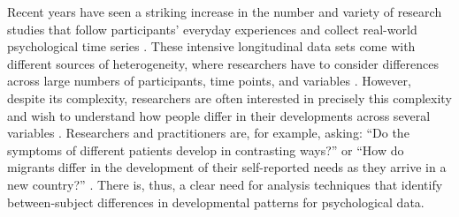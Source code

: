\documentclass[man, 12pt, a4paper, floatsintext]{apa7}
\theoremstyle{break}
\theoremstyle{plain}
\begin{document}

Recent years have seen a striking increase in the number and variety of research studies that follow participants' everyday experiences and collect real-world psychological time series \citep[e.g.,][]{hamaker2017}. These intensive longitudinal data sets come with different sources of heterogeneity, where researchers have to consider differences across large numbers of participants, time points, and variables \citep[e.g.,][]{cattell1966, wardenaar2013}. However, despite its complexity, researchers are often interested in precisely this complexity and wish to understand how people differ in their developments across several variables \citep[e.g.,][]{ernst2021}. Researchers and practitioners are, for example, asking: ``Do the symptoms of different patients develop in contrasting ways?'' \citep{Monden2015} or ``How do migrants differ in the development of their self-reported needs as they arrive in a new country?'' \citep{Kreienkamp2022d}. There is, thus, a clear need for analysis techniques that identify between-subject differences in developmental patterns for psychological data.
\end{document}
